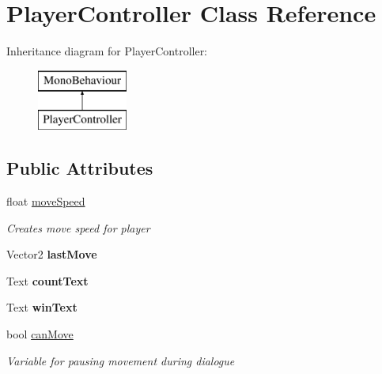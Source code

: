 \hypertarget{class_player_controller}{}\section{Player\+Controller Class Reference}
\label{class_player_controller}
Inheritance diagram for Player\+Controller\+:\begin{figure}[H]
\begin{center}
\leavevmode
\includegraphics[height=2.000000cm]{class_player_controller}
\end{center}
\end{figure}
\subsection*{Public Attributes}
\begin{DoxyCompactItemize}
\item 
float \mbox{\hyperlink{class_player_controller_abb12e85ca1b12efdbc8684bff2e19c4c}{move\+Speed}}
\begin{DoxyCompactList}\small\item\em Creates move speed for player \end{DoxyCompactList}\item 
\mbox{\label{class_player_controller_a8734946783cad257b722f45fe4af8c6c}} 
Vector2 {\bfseries last\+Move}
\item 
\mbox{\label{class_player_controller_a61795bee5f0ca4705f688419919e3086}} 
Text {\bfseries count\+Text}
\item 
\mbox{\label{class_player_controller_a366f431ae274e7b19365f7b15b1709b8}} 
Text {\bfseries win\+Text}
\item 
bool \mbox{\hyperlink{class_player_controller_a14bb057d727180f87728bd6fe62dffc9}{can\+Move}}
\begin{DoxyCompactList}\small\item\em Variable for pausing movement during dialogue \end{DoxyCompactList}\end{DoxyCompactItemize}
